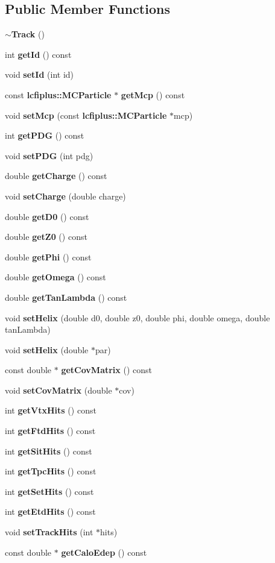 \subsection*{Public Member Functions}
\begin{DoxyCompactItemize}
\item 
{\bf $\sim$\-Track} ()
\item 
int {\bf get\-Id} () const 
\item 
void {\bf set\-Id} (int id)
\item 
const {\bf lcfiplus\-::\-M\-C\-Particle} $\ast$ {\bf get\-Mcp} () const 
\item 
void {\bf set\-Mcp} (const {\bf lcfiplus\-::\-M\-C\-Particle} $\ast$mcp)
\item 
int {\bf get\-P\-D\-G} () const 
\item 
void {\bf set\-P\-D\-G} (int pdg)
\item 
double {\bf get\-Charge} () const 
\item 
void {\bf set\-Charge} (double charge)
\item 
double {\bf get\-D0} () const 
\item 
double {\bf get\-Z0} () const 
\item 
double {\bf get\-Phi} () const 
\item 
double {\bf get\-Omega} () const 
\item 
double {\bf get\-Tan\-Lambda} () const 
\item 
void {\bf set\-Helix} (double d0, double z0, double phi, double omega, double tan\-Lambda)
\item 
void {\bf set\-Helix} (double $\ast$par)
\item 
const double $\ast$ {\bf get\-Cov\-Matrix} () const 
\item 
void {\bf set\-Cov\-Matrix} (double $\ast$cov)
\item 
int {\bf get\-Vtx\-Hits} () const 
\item 
int {\bf get\-Ftd\-Hits} () const 
\item 
int {\bf get\-Sit\-Hits} () const 
\item 
int {\bf get\-Tpc\-Hits} () const 
\item 
int {\bf get\-Set\-Hits} () const 
\item 
int {\bf get\-Etd\-Hits} () const 
\item 
void {\bf set\-Track\-Hits} (int $\ast$hits)
\item 
const double $\ast$ {\bf get\-Calo\-Edep} () const 
\item 

\end{DoxyCompactItemize}
